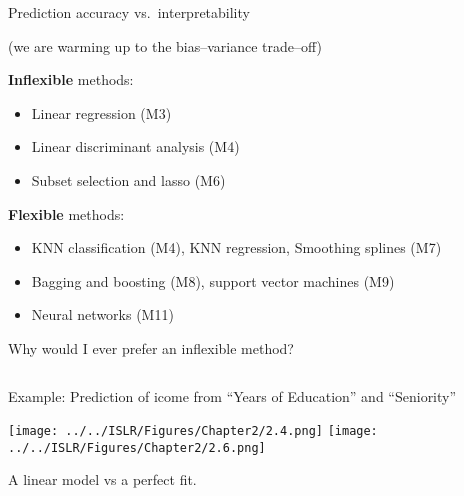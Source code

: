 \documentclass[ignorenonframetext,]{beamer}
\providecommand{\tightlist}{%
  \setlength{\itemsep}{0pt}\setlength{\parskip}{0pt}}
\begin{document}
\begin{frame}{Prediction accuracy vs.~interpretability}
\protect\hypertarget{prediction-accuracy-vs.interpretability}{}

(we are warming up to the bias--variance trade--off)

\textbf{Inflexible} methods:

\begin{itemize}
\tightlist
\item
  Linear regression (M3)
\item
  Linear discriminant analysis (M4)
\item
  Subset selection and lasso (M6)
\end{itemize}

\textbf{Flexible} methods:

\begin{itemize}
\tightlist
\item
  KNN classification (M4), KNN regression, Smoothing splines (M7)
\item
  Bagging and boosting (M8), support vector machines (M9)
\item
  Neural networks (M11)
\end{itemize}

\end{frame}

\begin{frame}

\begin{block}{Why would I ever prefer an inflexible method?}

\(~\)

Example: Prediction of icome from ``Years of Education'' and
``Seniority''\vspace{2mm}

\centering

\texttt{[image: ../../ISLR/Figures/Chapter2/2.4.png]}
\texttt{[image: ../../ISLR/Figures/Chapter2/2.6.png]}

A linear model vs a perfect fit.

\end{block}

\end{frame}
\end{document}
